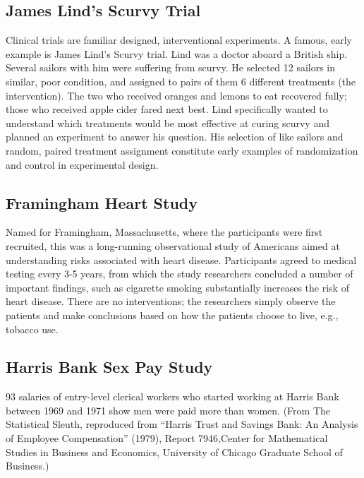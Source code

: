 \documentclass[
]{book}
\begin{document}
\hypertarget{james-linds-scurvy-trial}{%
\subsection{James Lind's Scurvy Trial}\label{james-linds-scurvy-trial}}

Clinical trials are familiar designed, interventional experiments. A famous, early example is James Lind's Scurvy trial. Lind was a doctor aboard a British ship. Several sailors with him were suffering from scurvy. He selected 12 sailors in similar, poor condition, and assigned to pairs of them 6 different treatments (the intervention). The two who received oranges and lemons to eat recovered fully; those who received apple cider fared next best. Lind specifically wanted to understand which treatments would be most effective at curing scurvy and planned an experiment to answer his question. His selection of like sailors and random, paired treatment assignment constitute early examples of randomization and control in experimental design.

\hypertarget{framingham-heart-study}{%
\subsection{Framingham Heart Study}\label{framingham-heart-study}}

Named for Framingham, Massachusetts, where the participants were first recruited, this was a long-running observational study of Americans aimed at understanding risks associated with heart disease. Participants agreed to medical testing every 3-5 years, from which the study researchers concluded a number of important findings, such as cigarette smoking substantially increases the risk of heart disease. There are no interventions; the researchers simply observe the patients and make conclusions based on how the patients choose to live, e.g., tobacco use.

\hypertarget{harris-bank-sex-pay-study}{%
\subsection{Harris Bank Sex Pay Study}\label{harris-bank-sex-pay-study}}

93 salaries of entry-level clerical workers who started working at Harris Bank between 1969 and 1971 show men were paid more than women. (From The Statistical Sleuth, reproduced from ``Harris Trust and Savings Bank: An Analysis of Employee Compensation'' (1979), Report 7946,Center for Mathematical Studies in Business and Economics, University of Chicago Graduate School of Business.)
\end{document}
